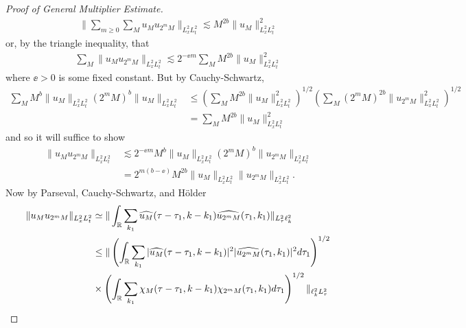 \begin{proof}[Proof of General Multiplier Estimate]
\begin{equation*}
\begin{split}
  \| \sum_{m \ge 0} \sum_{M} u_{M} u_{2^{m}M} \|_{L^{2}_{x}L^{2}_{t}}
  \lesssim M^{2b} \| u_{M} \|_{L^{2}_{x}L^{2}_{t}}^{2}
\end{split}
\end{equation*}
%
%
or, by the triangle inequality, that
%
%
\begin{equation*}
\begin{split}
  \sum_{M} \| u_{M} u_{2^{m}M} \|_{L^{2}_{x}L^{2}_{t}}
\lesssim 2^{-\ee m} \sum_{M} M^{2b} \| u_{M} \|_{L^{2}_{x}L^{2}_{t}}^{2}
\end{split}
\end{equation*}
where $\ee > 0$ is some fixed constant.
But by Cauchy-Schwartz,
%
%
\begin{equation*}
\begin{split}
  \sum_{M} M^{b} \| u_{M} \|_{L^{2}_{x}L^{2}_{t}} (2^{m}M)^{b} \| u_{M} \|_{L^{2}_{x}L^{2}_{t}} 
  & \le (\sum_{M} M^{2b} \| u_{M} \|_{L^{2}_{x}L^{2}_{t}}^{2})^{1/2}
  (\sum_{M} (2^{m}M)^{2b} \| u_{2^{m}M} \|_{L^{2}_{x}L^{2}_{t}}^{2})^{1/2}
  \\
  & = \sum_{M} M^{2b} \| u_{M} \|_{L^{2}_{x}L^{2}_{t}}^{2}
\end{split}
\end{equation*}
%
%
and so it will suffice to show
\begin{equation*}
\begin{split}
\| u_{M} u_{2^{m}M} \|_{L^{2}_{x}L^{2}_{t}}
& \lesssim 2^{-\ee m} M^{b} \| u_{M} \|_{L^{2}_{x}L^{2}_{t}}
(2^{m} M)^{b} \| u_{2^{m} M} \|_{L^{2}_{x}L^{2}_{t}}
\\
& = 2^{m(b - \ee)} M^{2b} \| u_{M} \|_{L^{2}_{x}L^{2}_{t}}
\| u_{2^{m} M} \|_{L^{2}_{x}L^{2}_{t}}.
\end{split}
\end{equation*}
%
Now by Parseval, Cauchy-Schwartz, and H\"older
%
%
\begin{equation*}
\begin{split}
\| u_{M} u_{2^{m}M} \|_{L^{2}_{x}L^{2}_{t}}
& \simeq \| \int_{\rr} \sum_{k_{1}} \wh{u_{M}}(\tau - \tau_{1}, k - k_{1}) \wh{u_{2^{m}M}}(\tau_{1}, k_{1}) \|_{L^{2}_{\tau} \ell^{2}_{k}}
\\
& \le \| \left( \int_{\rr} \sum_{k_{1}} | \wh{u_{M}}(\tau - \tau_{1}, k - k_{1}) |^{2} | \wh{u_{2^{m}M}}(\tau_{1}, k_{1}) |^{2} d \tau_{1} \right)^{1/2} 
\\
& \times \left ( \int_{\rr} \sum_{k_{1}} \chi_{M}(\tau - \tau_{1}, k - k_{1}) \chi_{2^{m}M}(\tau_{1}, k_{1}) d \tau_{1} \right ) ^{1/2} \|_{\ell^{2}_{k} L^{2}_{\tau}}

\end{split}
\end{equation*}
\end{proof}
